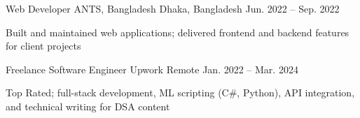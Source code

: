 \begin{cventries}
  \cventry
    {Web Developer}
    {ANTS, Bangladesh}
    {Dhaka, Bangladesh}
    {Jun. 2022 – Sep. 2022}
    {
      \begin{cvitems}
        \item {Built and maintained web applications; delivered frontend and backend features for client projects}
      \end{cvitems}
    }

  \cventry
    {Freelance Software Engineer}
    {Upwork}
    {Remote}
    {Jan. 2022 – Mar. 2024}
    {
      \begin{cvitems}
        \item {Top Rated; full-stack development, ML scripting (C\#, Python), API integration, and technical writing for DSA content}
      \end{cvitems}
    }

\end{cventries}
